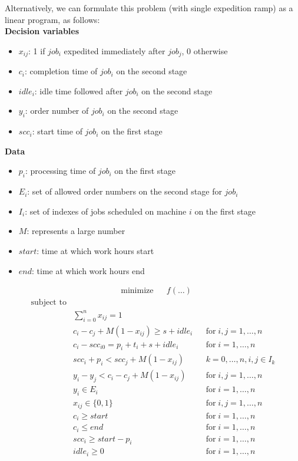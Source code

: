 \documentclass{ctuthesis}
\begin{document}
Alternatively, we can formulate this problem (with single expedition ramp) as a linear program, as follows:\\
\textbf{Decision variables}

\begin{itemize}
\item $x_{ij}$: 1 if $job_i$ expedited immediately after $job_j$, 0 otherwise
\item$c_i$: completion time of $job_i$ on the second stage
\item$idle_i$: idle time followed after $job_i$ on the second stage
\item$y_i$: order number of $job_i$ on the second stage
\item$scc_i$: start time of $job_i$ on the first stage 
\end{itemize}
\textbf{Data}
\begin{itemize}
\item$p_i$: processing time of $job_i$ on the first stage
\item$E_i$: set of allowed order numbers on the second stage for $job_i$
\item$I_i$: set of indexes of jobs scheduled on machine $i$ on the first stage
\item$M$: represents a large number
\item$start$: time at which work hours start
\item$end$: time at which work hours end
\end{itemize}

\begin{equation}
\begin{aligned}
&\text{minimize}
&&f(\ldots)
\end{aligned}
\end{equation}
\begin{equation}
\begin{aligned}
\text{subject to}\\
& \sum_{i=0}^{n} x_{ij} = 1 &&\\
& c_{i} - c_{j} + M(1 - x_{ij}) \geq s + idle_{i} && \text{for}\; i,j = 1, \ldots, n\\
& c_{i} - scc_{i0} = p_{i} + t_i + s + idle_i && \text{for}\; i = 1, \ldots, n\\
& scc_{i} + p_i < scc_j + M(1 - x_{ij}) && k = 0,\ldots,n, i,j \in I_k\\
& y_{i} - y_{j} < c_i - c_j + M(1 - x_{ij}) && \text{for}\; i,j = 1, \ldots, n\\
& y_i \in E_i && \text{for}\; i = 1, \ldots, n\\
& x_{ij} \in \{0, 1\}  && \text{for}\; i,j = 1, \ldots, n\\ 
& c_i \geq start && \text{for}\; i = 1, \ldots, n\\
& c_i \leq end && \text{for}\; i = 1, \ldots, n\\
& scc_{i} \geq start - p_i && \text{for}\; i = 1, \ldots, n\\
& idle_i \geq 0 && \text{for}\; i = 1, \ldots, n\\
\end{aligned}
\end{equation}
\\
\end{document}
